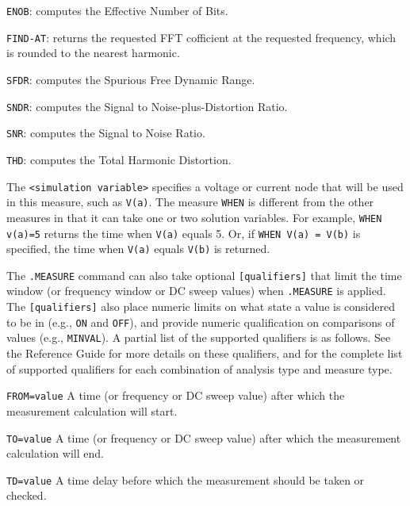{{\begin{XyceItemize}
  \item \texttt{ENOB}: computes the Effective Number of Bits.
  \item \texttt{FIND-AT}: returns the requested FFT cofficient at the
     requested frequency, which is rounded to the nearest harmonic.
  \item \texttt{SFDR}: computes the Spurious Free Dynamic Range.
  \item \texttt{SNDR}: computes the Signal to Noise-plus-Distortion Ratio.
  \item \texttt{SNR}: computes the Signal to Noise Ratio.
  \item \texttt{THD}: computes the Total Harmonic Distortion.
\end{XyceItemize}

The \texttt{<simulation variable>} specifies a voltage or current node that
will be used in this measure, such as \texttt{V(a)}.  The measure \texttt{WHEN}
is different from the other measures in that it can take one or two solution
variables. For example, \texttt{WHEN v(a)=5} returns the time when
\texttt{V(a)} equals 5.  Or, if \texttt{WHEN V(a) = V(b)} is specified, the
time when \texttt{V(a)} equals \texttt{V(b)} is returned.

The \texttt{.MEASURE} command can also take optional \texttt{[qualifiers]} that
limit the time window (or frequency window or DC sweep values) when \texttt{.MEASURE} is 
applied. The \texttt{[qualifiers]} also place numeric limits on what state a value is
considered to be in (e.g., \texttt{ON} and \texttt{OFF}), and provide numeric
qualification on comparisons of values (e.g., \texttt{MINVAL}).  A partial list of the supported
qualifiers is as follows.  See the \Xyce{} Reference Guide\ReferenceGuide{} for more details
on these qualifiers, and for the complete list of supported qualifiers for each combination
of analysis type and measure type.

\begin{XyceItemize}
\item \texttt{FROM=value} A time (or frequency or DC sweep value) after which the 
measurement calculation will start.

\item \texttt{TO=value} A time (or frequency or DC sweep value) after which the 
measurement calculation will end.

\item \texttt{TD=value} A time delay before which the measurement should be taken or checked.


\end{XyceItemize}}}
